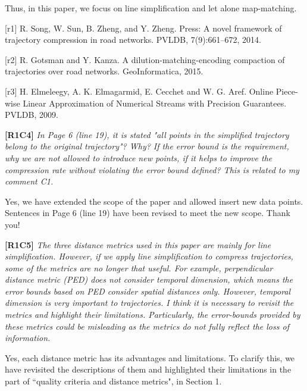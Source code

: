 \documentclass{letter}
\begin{document}
Thus, in this paper, we focus on line simplification and let alone map-matching.

[r1] R. Song, W. Sun, B. Zheng, and Y. Zheng. Press: A novel framework of trajectory compression in road networks. PVLDB, 7(9):661--672, 2014.

[r2] R. Gotsman and Y. Kanza. A dilution-matching-encoding compaction of trajectories over road networks.
GeoInformatica, 2015.

[r3] H. Elmeleegy, A. K. Elmagarmid, E. Cecchet and W. G. Aref. Online Piece-wise Linear Approximation of Numerical Streams with Precision Guarantees. PVLDB, 2009.


\textbf{[R1C4]} \emph{ In Page 6 (line 19), it is stated "all points in the simplified trajectory belong to the original trajectory"? Why? If the error bound is the requirement, why we are not allowed to introduce new points, if it helps to improve the compression rate without violating the error bound defined? This is related to my comment C1. }

Yes, we have extended the scope of the paper and allowed insert new data points. Sentences in Page 6 (line 19) have been revised to meet the new scope. Thank you!


\textbf{[R1C5]} \emph{The three distance metrics used in this paper are mainly for line simplification. However, if we apply line simplification to compress trajectories, some of the metrics are no longer that useful. For example, perpendicular distance metric (PED) does not consider temporal dimension, which means the error bounds based on PED consider spatial distances only. However, temporal dimension is very important to trajectories. I think it is necessary to revisit the metrics and highlight their limitations. Particularly, the error-bounds provided by these metrics could be misleading as the metrics do not fully reflect the loss of information. }

Yes, each distance metric has its advantages and limitations. To clarify this, we have revisited the descriptions of them and highlighted their limitations in the part of ``quality criteria and distance metrics", in Section 1.
\end{document}
